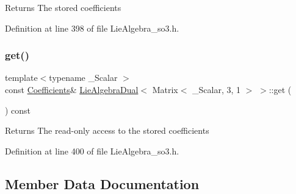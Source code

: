 \begin{DoxyReturn}{Returns}
The stored coefficients 
\end{DoxyReturn}


Definition at line 398 of file Lie\+Algebra\+\_\+so3.\+h.

\hypertarget{class_lie_algebra_dual_3_01_matrix_3_01___scalar_00_013_00_011_01_4_01_4_af6625b0911823ad35ae1f5fa23c3d7db}{}\label{class_lie_algebra_dual_3_01_matrix_3_01___scalar_00_013_00_011_01_4_01_4_af6625b0911823ad35ae1f5fa23c3d7db} 
\subsubsection{\texorpdfstring{get()}{get()}\hspace{0.1cm}{\footnotesize\ttfamily [2/2]}}
{\footnotesize\ttfamily template$<$typename \+\_\+\+Scalar $>$ \\
const \hyperlink{class_lie_algebra_dual_3_01_matrix_3_01___scalar_00_013_00_011_01_4_01_4_ae90a3999d66fafefffe5538cd72985ee}{Coefficients}\& \hyperlink{class_lie_algebra_dual}{Lie\+Algebra\+Dual}$<$ Matrix$<$ \+\_\+\+Scalar, 3, 1 $>$ $>$\+::get (\begin{DoxyParamCaption}{ }\end{DoxyParamCaption}) const\hspace{0.3cm}{\ttfamily [inline]}}

\begin{DoxyReturn}{Returns}
The read-\/only access to the stored coefficients 
\end{DoxyReturn}


Definition at line 400 of file Lie\+Algebra\+\_\+so3.\+h.



\subsection{Member Data Documentation}
\hypertarget{class_lie_algebra_dual_3_01_matrix_3_01___scalar_00_013_00_011_01_4_01_4_a85d9fafc5af8ef5b52eb738f5ff191b3}{}\label{class_lie_algebra_dual_3_01_matrix_3_01___scalar_00_013_00_011_01_4_01_4_a85d9fafc5af8ef5b52eb738f5ff191b3} 

